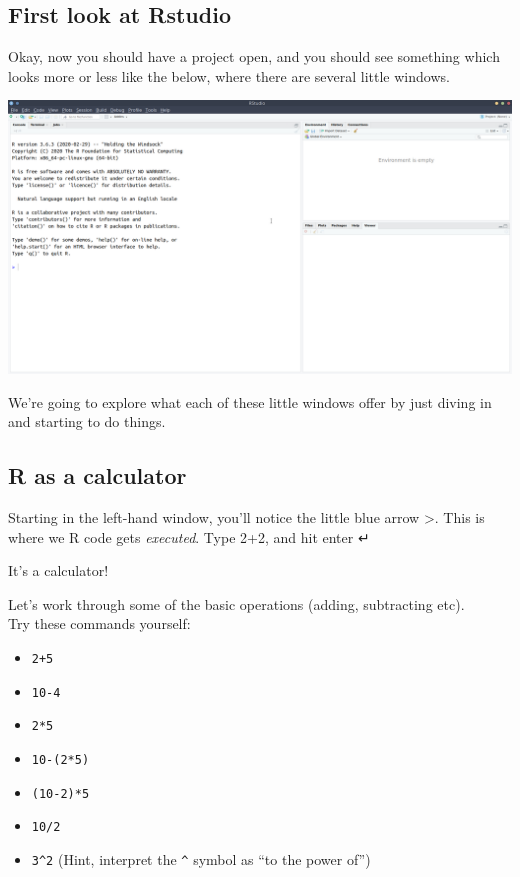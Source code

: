 \documentclass[]{book}
\providecommand{\tightlist}{%
  \setlength{\itemsep}{0pt}\setlength{\parskip}{0pt}}
\begin{document}
\hypertarget{first-look-at-rstudio}{%
\subsection*{First look at Rstudio}\label{first-look-at-rstudio}}

Okay, now you should have a project open, and you should see something which looks more or less like the below, where there are several little windows.

\includegraphics{images/installing_intro/freshr.png}

We're going to explore what each of these little windows offer by just diving in and starting to do things.

\hypertarget{r-as-a-calculator}{%
\subsection*{R as a calculator}\label{r-as-a-calculator}}

Starting in the left-hand window, you'll notice the little blue arrow {\textgreater{}}.
This is where we R code gets \emph{executed}.
Type 2+2, and hit enter ↵

It's a calculator!

Let's work through some of the basic operations (adding, subtracting etc).\\
Try these commands yourself:

\begin{itemize}
\tightlist
\item
  \texttt{2+5}
\item
  \texttt{10-4}
\item
  \texttt{2*5}
\item
  \texttt{10-(2*5)}
\item
  \texttt{(10-2)*5}
\item
  \texttt{10/2}
\item
  \texttt{3\^{}2} (Hint, interpret the \texttt{\^{}} symbol as ``to the power of'')
\end{itemize}
\end{document}
